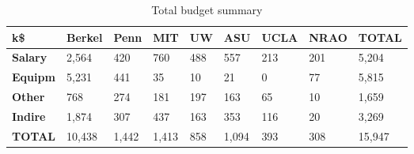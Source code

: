 

\begin{table}[h]
\centering
\caption{Total budget summary}
\label{tab:expenses}
\begin{tabular}{| p{0.5in} | p{.6in} |  p{.6in} |  p{.6in} |  p{.6in} |  p{.6in} |  p{.6in} |  p{.6in} |  p{.6in} | }\hline
  k\$   & \textbf{Berkel} & \textbf{Penn} & \textbf{MIT} & \textbf{UW} & \textbf{ASU} & \textbf{UCLA} & \textbf{NRAO} & \textbf{TOTAL}\\\hline
\textbf{Salary}&       2,564  &         420  &         760  &         488  &         557  &         213  &         201  &       5,204  \\\hline
\textbf{Equipm}&       5,231  &         441  &          35  &          10  &          21  &           0  &          77  &       5,815  \\\hline
\textbf{Other}&         768  &         274  &         181  &         197  &         163  &          65  &          10  &       1,659  \\\hline
\textbf{Indire}&       1,874  &         307  &         437  &         163  &         353  &         116  &          20  &       3,269  \\\hline
\textbf{TOTAL}&      10,438  &       1,442  &       1,413  &         858  &       1,094  &         393  &         308  &      15,947  \\\hline
\end{tabular}
\end{table}
